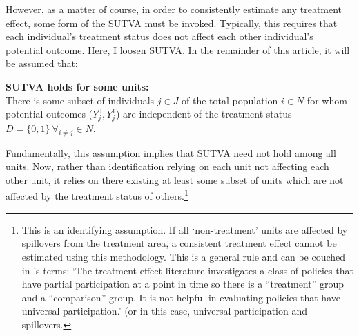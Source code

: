 However, as a matter of course, in order to consistently estimate any treatment 
effect, some form of the SUTVA must be invoked.  Typically, this requires that 
each individual's treatment status does not affect each other individual's 
potential outcome.  Here, I loosen SUTVA. In the remainder of this article, it 
will be assumed that:
\begin{assumption}{3}{}
\label{Sass:SUTVAs}
\textbf{SUTVA holds for some units:} \\
There is some subset of individuals $j\in J$ of the total population $i\in N$ 
for whom potential outcomes ($Y_j^0, Y_j^1$) are independent of the treatment 
status $D=\{0,1\}\ \forall_{i\neq j} \in N$.
\end{assumption}
\vspace{-4mm}
\noindent Fundamentally, this assumption implies that SUTVA need not hold among 
all units.  Now, rather than identification relying on each unit not affecting 
each other unit, it relies on there existing at least some subset of units which 
are not affected by the treatment status of others.\footnote{This is an 
identifying assumption. If all `non-treatment' units are affected by spillovers 
from the treatment area, a consistent treatment effect cannot be estimated using 
this methodology. This is a general rule and can be couched in 
\citet{HeckmanVytlacil2005}'s terms: `The treatment effect literature 
investigates a class of policies that have partial participation at a point in 
time so there is a ``treatment'' group and a ``comparison'' group. It is not 
helpful in evaluating policies that have universal participation.' (or in this 
case, universal participation and spillovers.}

